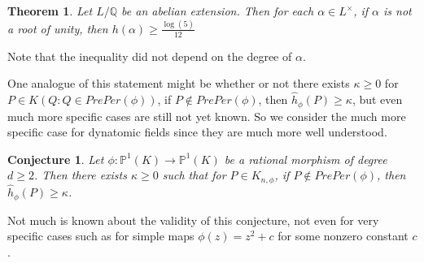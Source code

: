 \documentclass[12pt]{amsart}
\newtheorem{thm}{Theorem}[subsection]
\newtheorem{conj}{Conjecture}
\theoremstyle{definition}
\theoremstyle{remark}
\theoremstyle{definition}
\newcommand{\Q}{\mathbb{Q}}
\renewcommand{\P}{\mathbb{P}}
\begin{document}
\begin{thm}

Let $L/\Q$ be an abelian extension. Then for each $\alpha \in L^{\times}$, if $\alpha$ is not a root of unity, then $h(\alpha) \geq \frac{\log(5)}{12}$
\end{thm}
 
Note that the inequality did not depend on the degree of $\alpha$.
 
One analogue of this statement might be whether or not there exists $\kappa \geq 0$ for $P \in K(Q:Q \in PrePer(\phi))$, if $ P \not \in PrePer(\phi)$, then $\hat{h}_{\phi}(P) \geq \kappa$, but even much more specific cases are still not yet known. So we consider the much more specific case for dynatomic fields since they are much more well understood.

\begin{conj}
Let $\phi: \P^1(K) \rightarrow \P^1(K)$ be a rational morphism of degree $d \geq 2$. Then there exists $\kappa \geq 0$ such that for $P \in K_{n,\phi}$, if $P \not\in PrePer(\phi)$, then $\hat{h}_{\phi}(P) \geq \kappa$. 
\end{conj}  

Not much is known about the validity of this conjecture, not even for very specific cases such as for simple maps $\phi(z) = z^2 + c$ for some nonzero constant $c$. 



\end{document}
